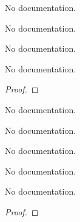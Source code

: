 \begin{definition}\label{one'}
        \leanok
                No documentation.
    \end{definition}

\begin{definition}\label{two'}
        \leanok
                No documentation.
    \end{definition}

\begin{definition}\label{Nat'.add}
                No documentation.
    \end{definition}

\begin{theorem}\label{my_lemma}
        \leanok
                No documentation.
    \end{theorem}

\begin{proof}
    \leanok
\end{proof}

\begin{definition}\label{FnUb}
        \leanok
                No documentation.
    \end{definition}

\begin{definition}\label{FnLb}
        \leanok
                No documentation.
    \end{definition}

\begin{definition}\label{FnHasUb}
        \leanok
                No documentation.
    \end{definition}

\begin{definition}\label{FnHasLb}
        \leanok
                No documentation.
    \end{definition}

\begin{theorem}\label{fnUb_add}
        \leanok
                No documentation.
    \end{theorem}

\begin{proof}
    \leanok
\end{proof}

